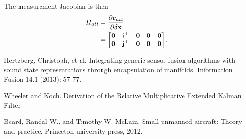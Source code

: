 \documentclass[english]{article}
\begin{document}
The measurement Jacobian is then
\begin{align}
H_{att} & = \frac{\partial {\bf r}_{att}}{\partial \delta {\bf x}} \\
& = \begin{bmatrix} {\bf 0} & {\bf i}^\top & {\bf 0} & {\bf 0} & {\bf 0} \\
{\bf 0} & {\bf j}^\top & {\bf 0} & {\bf 0} & {\bf 0} \end{bmatrix}.
\end{align}



\begin{thebibliography}{1}

Hertzberg, Christoph, et al. \textquotedbl{}Integrating
generic sensor fusion algorithms with sound state representations
through encapsulation of manifolds.\textquotedbl{} Information Fusion
14.1 (2013): 57-77.

Wheeler and Koch. \textquotedbl{}Derivation of the Relative Multiplicative
Extended Kalman Filter\textquotedbl{}

Beard, Randal W., and Timothy W. McLain. \textquotedbl{}Small unmanned aircraft: Theory and practice\textquotedbl{}. Princeton university press, 2012.

\end{thebibliography}
\end{document}

